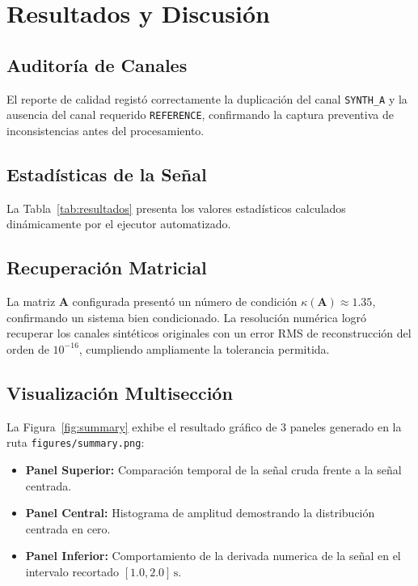 \documentclass[11pt,a4paper]{article}
\begin{document}
\section{Resultados y Discusión}

\subsection{Auditoría de Canales}
El reporte de calidad registó correctamente la duplicación del canal \texttt{SYNTH\_A} y la ausencia del canal requerido \texttt{REFERENCE}, confirmando la captura preventiva de inconsistencias antes del procesamiento.

\subsection{Estadísticas de la Señal}
La Tabla~\ref{tab:resultados} presenta los valores estadísticos calculados dinámicamente por el ejecutor automatizado.

\begin{table}[htbp]
  \centering
  \caption{Resumen estadístico de las señales generado automáticamente por el pipeline.}
  \label{tab:resultados}
  
\end{table}

\subsection{Recuperación Matricial}
La matriz $\mathbf{A}$ configurada presentó un número de condición $\kappa(\mathbf{A}) \approx 1.35$, confirmando un sistema bien condicionado. La resolución numérica logró recuperar los canales sintéticos originales con un error RMS de reconstrucción del orden de $10^{-16}$, cumpliendo ampliamente la tolerancia permitida.

\subsection{Visualización Multisección}
La Figura~\ref{fig:summary} exhibe el resultado gráfico de 3 paneles generado en la ruta \texttt{figures/summary.png}:
\begin{itemize}
    \item \textbf{Panel Superior:} Comparación temporal de la señal cruda frente a la señal centrada.
    \item \textbf{Panel Central:} Histograma de amplitud demostrando la distribución centrada en cero.
    \item \textbf{Panel Inferior:} Comportamiento de la derivada numerica de la señal en el intervalo recortado $[1.0, 2.0]\,\si{\second}$.
\end{itemize}
\end{document}
